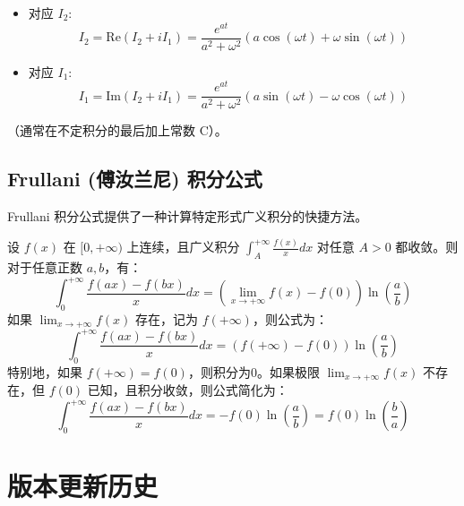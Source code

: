 \documentclass[lang=cn,newtx,10pt,scheme=chinese]{elegantbook}
\renewcommand{\textbf}[1]{\text{\heiti #1}}
\begin{document}
\begin{itemize}
    \item \textbf{实部} 对应 $I_2$:
    \begin{equation}
        I_2 = \text{Re}(I_2 + iI_1) = \frac{e^{at}}{a^2+\omega^2} (a\cos(\omega t) + \omega\sin(\omega t))
    \end{equation}
    
    \item \textbf{虚部 } 对应 $I_1$:
    \begin{equation}
        I_1 = \text{Im}(I_2 + iI_1) = \frac{e^{at}}{a^2+\omega^2} (a\sin(\omega t) - \omega\cos(\omega t))
    \end{equation}
\end{itemize}
（通常在不定积分的最后加上常数 C）。
\section{Frullani (傅汝兰尼) 积分公式}
Frullani 积分公式提供了一种计算特定形式广义积分的快捷方法。

\textbf{公式：} 设 $f(x)$ 在 $[0, +\infty)$ 上连续，且广义积分 $\int_A^{+\infty} \frac{f(x)}{x} dx$ 对任意 $A > 0$ 都收敛。则对于任意正数 $a, b$，有：
$$
\int_0^{+\infty} \frac{f(ax) - f(bx)}{x} dx = \left( \lim_{x \to +\infty} f(x) - f(0) \right) \ln\left(\frac{a}{b}\right)
$$
如果 $\lim_{x \to +\infty} f(x)$ 存在，记为 $f(+\infty)$，则公式为：
$$
\int_0^{+\infty} \frac{f(ax) - f(bx)}{x} dx = \left( f(+\infty) - f(0) \right) \ln\left(\frac{a}{b}\right)
$$
特别地，如果 $f(+\infty) = f(0)$，则积分为0。如果极限 $\lim_{x \to +\infty} f(x)$ 不存在，但 $f(0)$ 已知，且积分收敛，则公式简化为：
$$
\int_0^{+\infty} \frac{f(ax) - f(bx)}{x} dx = -f(0) \ln\left(\frac{a}{b}\right) = f(0) \ln\left(\frac{b}{a}\right)
$$

\appendix
\chapter{版本更新历史}

\end{document}
